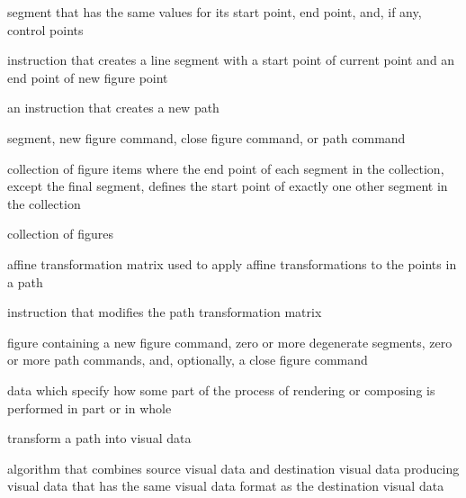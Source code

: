 %
segment that has the same values for its start point, end point, and, if any, control points

%
 instruction that creates a line segment with a start point of current point and an end point of new figure point

%
 an instruction that creates a new path

%
segment, new figure command, close figure command, or path command

%
collection of figure items where the end point of each segment in the collection, except the final segment, defines the start point of exactly one other segment in the collection

%
collection of figures

%
affine transformation matrix used to apply affine transformations to the points in a path

%
instruction that modifies the path transformation matrix

%
figure containing a new figure command, zero or more degenerate segments, zero or more path commands, and, optionally, a close figure command

%
data which specify how some part of the process of rendering or composing is performed in part or in whole

%
transform a path into visual data

%
%
algorithm that combines source visual data and destination visual data producing visual data that has the same visual data format as the destination visual data

